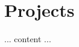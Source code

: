 \documentclass[a4paper,10pt]{article}
\begin{document}
\section*{Projects}
... content ...


\end{document}
